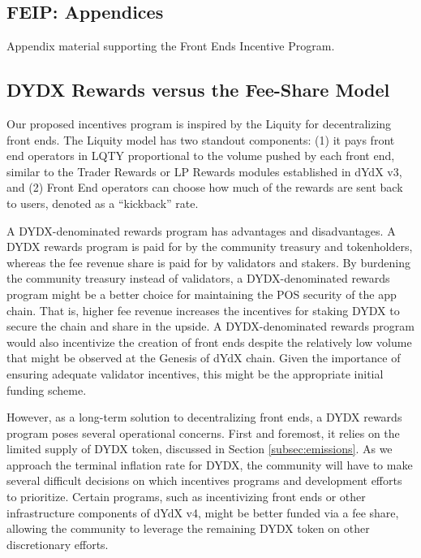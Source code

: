 \begin{fullwidth}
    \section{FEIP: Appendices} \label{app:feip_appendices}
\end{fullwidth}

    Appendix material supporting the Front Ends Incentive Program.

    \subsection{DYDX Rewards versus the Fee-Share Model} \label{subapp:liquity}

            Our proposed incentives program is inspired by the Liquity  for decentralizing front ends. The Liquity model has two standout components: (1) it pays front end operators in LQTY proportional to the volume pushed by each front end, similar to the Trader Rewards or LP Rewards modules established in dYdX v3, and (2) Front End operators can choose how much of the rewards are sent back to users, denoted as a ``kickback'' rate.
            
            A DYDX-denominated rewards program has advantages and disadvantages. A DYDX rewards program is paid for by the community treasury and tokenholders, whereas the fee revenue share is paid for by validators and stakers. By burdening the community treasury instead of validators, a DYDX-denominated rewards program might be a better choice for maintaining the POS security of the app chain. That is, higher fee revenue increases the incentives for staking DYDX to secure the chain and share in the upside. A DYDX-denominated rewards program would also incentivize the creation of front ends despite the relatively low volume that might be observed at the Genesis of dYdX chain. Given the importance of ensuring adequate validator incentives, this might be the appropriate initial funding scheme.
            
            However, as a long-term solution to decentralizing front ends, a DYDX rewards program poses several operational concerns. First and foremost, it relies on the limited supply of DYDX token, discussed in Section \ref{subsec:emissions}. As we approach the terminal inflation rate for DYDX, the community will have to make several difficult decisions on which incentives programs and development efforts to prioritize. Certain programs, such as incentivizing front ends or other infrastructure components of dYdX v4, might be better funded via a fee share, allowing the community to leverage the remaining DYDX token on other discretionary efforts.

